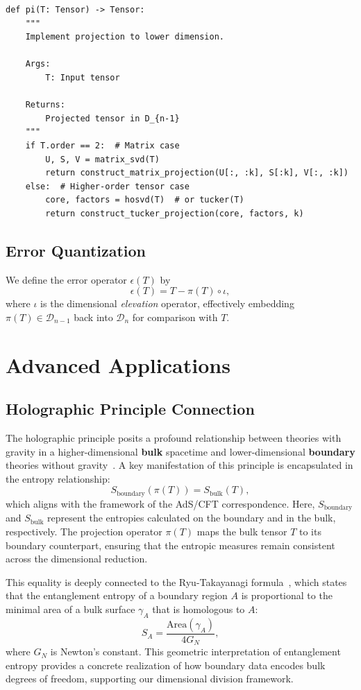\documentclass[sn-mathphys-num]{sn-jnl}
\theoremstyle{thmstyleone}
\theoremstyle{thmstyletwo}
\theoremstyle{thmstylethree}
\begin{document}
\begin{verbatim}
def pi(T: Tensor) -> Tensor:
    """
    Implement projection to lower dimension.
    
    Args:
        T: Input tensor
        
    Returns:
        Projected tensor in D_{n-1}
    """
    if T.order == 2:  # Matrix case
        U, S, V = matrix_svd(T)
        return construct_matrix_projection(U[:, :k], S[:k], V[:, :k])
    else:  # Higher-order tensor case
        core, factors = hosvd(T)  # or tucker(T)
        return construct_tucker_projection(core, factors, k)
\end{verbatim}

\subsection{Error Quantization}

We define the error operator $\epsilon(T)$ by
\[
\epsilon(T) = T - \pi(T) \circ \iota,
\]
where $\iota$ is the dimensional \emph{elevation} operator, effectively embedding 
$\pi(T) \in \mathcal{D}_{n-1}$ back into $\mathcal{D}_n$ for comparison with $T$.

\section{Advanced Applications}

\subsection{Holographic Principle Connection}
The holographic principle posits a profound relationship between theories with gravity in a higher-dimensional \textbf{bulk} spacetime and lower-dimensional \textbf{boundary} theories without gravity~\cite{maldacena1999large}. A key manifestation of this principle is encapsulated in the entropy relationship:
\[
S_{\text{boundary}}(\pi(T)) = S_{\text{bulk}}(T),
\]
which aligns with the framework of the AdS/CFT correspondence. Here, $S_{\text{boundary}}$ and $S_{\text{bulk}}$ represent the entropies calculated on the boundary and in the bulk, respectively. The projection operator $\pi(T)$ maps the bulk tensor $T$ to its boundary counterpart, ensuring that the entropic measures remain consistent across the dimensional reduction.

This equality is deeply connected to the Ryu-Takayanagi formula~\cite{ryu2006holographic}, which states that the entanglement entropy of a boundary region $A$ is proportional to the minimal area of a bulk surface $\gamma_A$ that is homologous to $A$:
\[
S_A = \frac{\text{Area}(\gamma_A)}{4G_N},
\]
where $G_N$ is Newton's constant. This geometric interpretation of entanglement entropy provides a concrete realization of how boundary data encodes bulk degrees of freedom, supporting our dimensional division framework.
\end{document}
